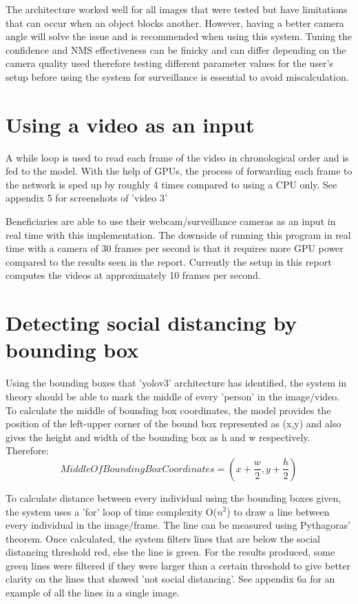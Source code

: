 \documentclass[12pt]{report}
\begin{document}
The architecture worked well for all images that were tested but have limitations that can occur when an object blocks another. However, having a better camera angle will solve the issue and is recommended when using this system. Tuning the confidence and NMS effectiveness can be finicky and can differ depending on the camera quality used therefore testing different parameter values for the user's setup before using the system for surveillance is essential to avoid miscalculation.

\section{Using a video as an input}

A while loop is used to read each frame of the video in chronological order and is fed to the model. With the help of GPUs, the process of forwarding each frame to the network is sped up by roughly 4 times compared to using a CPU only. See appendix 5 for screenshots of 'video 3'

\vspace{2mm}

Beneficiaries are able to use their webcam/surveillance cameras as an input in real time with this implementation. The downside of running this program in real time with a camera of 30 frames per second is that it requires more GPU power compared to the results seen in the report. Currently the setup in this report computes the videos at approximately 10 frames per second. 

\section{Detecting social distancing by bounding box}

Using the bounding boxes that 'yolov3' architecture has identified, the system in theory should be able to mark the middle of every 'person' in the image/video. To calculate the middle of bounding box coordinates, the model provides the position of the left-upper corner of the bound box represented as (x,y) and also gives the height and width of the bounding box as h and w respectively. Therefore:
\begin{equation*}
Middle Of Bounding Box Coordinates = (x+\frac{w}{2}, y+\frac{h}{2})
\end{equation*}


To calculate distance between every individual using the bounding boxes given, the system uses a 'for' loop of time complexity O($n^2$) to draw a line between every individual in the image/frame. The line can be measured using Pythagoras' theorem. Once calculated, the system filters lines that are below the social distancing threshold red, else the line is green. For the results produced, some green lines were filtered if they were larger than a certain threshold to give better clarity on the lines that showed 'not social distancing'. See appendix 6a for an example of all the lines in a single image.
\end{document}
